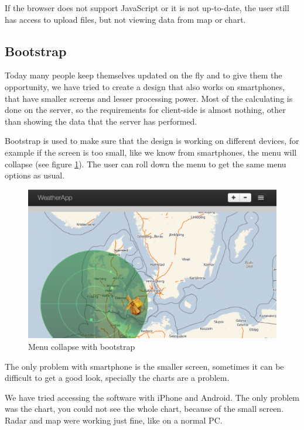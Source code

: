 If the browser does not support JavaScript or it is not up-to-date, the user still has access to upload files, but not viewing data from map or chart.

\subsection{Bootstrap}
Today many people keep themselves updated on the fly and to give them the opportunity, we have tried to create a design that also works on smartphones, that have smaller screens and lesser processing power. Most of the calculating is done on the server, so the requirements for client-side is almost nothing, other than showing the data that the server has performed.

Bootstrap is used to make sure that the design is working on different devices, for example if the screen is too small, like we know from smartphones, the menu will collapse (see figure \ref{fig:bootstrap}). The user can roll down the menu to get the same menu options as usual.

\begin{figure}[htbp]
\centering
   \includegraphics[scale=.5]{figure/bootstrap.eps}
   \caption{Menu collapse with bootstrap}
   \label{fig:bootstrap}
\end{figure}

The only problem with smartphone is the smaller screen, sometimes it can be difficult to get a good look, specially the charts are a problem.

We have tried accessing the software with iPhone and Android. The only problem was the chart, you could not see the whole chart, because of the small screen. Radar and map were working just fine, like on a normal PC.

